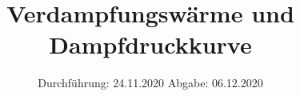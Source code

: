 

\subject{V203}
\title{Verdampfungswärme und Dampfdruckkurve}
\date{%
  Durchführung: 24.11.2020
  \hspace{3em}
  Abgabe: 06.12.2020
}



\maketitle
\thispagestyle{empty}
\tableofcontents
\newpage






\nocite{Anleitung}
\printbibliography{}


